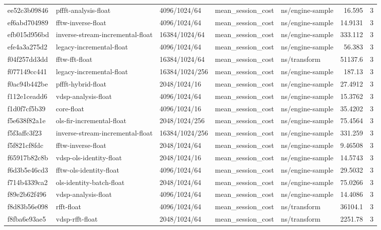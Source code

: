 \begin{longtable}{lllllrr}
ee52c3b09846 & pffft-analysis-float & 4096/1024/64 & mean\_session\_cost & ns/engine-sample & 16.595 & 3 \\
ef6abd704989 & fftw-inverse-float & 4096/1024/64 & mean\_session\_cost & ns/engine-sample & 14.9131 & 3 \\
efb015d956bd & inverse-stream-incremental-float & 16384/1024/64 & mean\_session\_cost & ns/engine-sample & 333.112 & 3 \\
efe4a3a275d2 & legacy-incremental-float & 4096/1024/64 & mean\_session\_cost & ns/engine-sample & 56.383 & 3 \\
f04f257dd3dd & fftw-fft-float & 16384/1024/64 & mean\_session\_cost & ns/transform & 51137.6 & 3 \\
f077149cc441 & legacy-incremental-float & 16384/1024/256 & mean\_session\_cost & ns/engine-sample & 187.13 & 3 \\
f0ac94b442be & pffft-hybrid-float & 2048/1024/16 & mean\_session\_cost & ns/engine-sample & 27.4912 & 3 \\
f112e1ceadd6 & vdsp-analysis-float & 4096/1024/64 & mean\_session\_cost & ns/engine-sample & 15.3762 & 3 \\
f1d0f7cf5b39 & core-float & 4096/1024/16 & mean\_session\_cost & ns/engine-sample & 35.4202 & 3 \\
f5e638f82a1e & ols-fir-incremental-float & 2048/1024/256 & mean\_session\_cost & ns/engine-sample & 75.4564 & 3 \\
f5f3affc3f23 & inverse-stream-incremental-float & 16384/1024/256 & mean\_session\_cost & ns/engine-sample & 331.259 & 3 \\
f5f821cf8fdc & fftw-inverse-float & 2048/1024/64 & mean\_session\_cost & ns/engine-sample & 9.46508 & 3 \\
f65917b82c8b & vdsp-ols-identity-float & 2048/1024/16 & mean\_session\_cost & ns/engine-sample & 14.5743 & 3 \\
f6d3b5e46cd3 & fftw-ols-identity-float & 4096/1024/64 & mean\_session\_cost & ns/engine-sample & 29.5032 & 3 \\
f714b4339ca2 & ols-identity-batch-float & 2048/1024/64 & mean\_session\_cost & ns/engine-sample & 75.0266 & 3 \\
f89e2b62f496 & vdsp-analysis-float & 4096/1024/64 & mean\_session\_cost & ns/engine-sample & 14.4086 & 3 \\
f8d83b56e098 & rfft-float & 4096/1024/64 & mean\_session\_cost & ns/transform & 36104.1 & 3 \\
f8fba6e93ae5 & vdsp-rfft-float & 2048/1024/64 & mean\_session\_cost & ns/transform & 2251.78 & 3 \\

\end{longtable}
